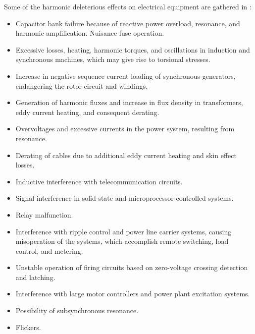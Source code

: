 \documentclass[12pt]{report} %
\begin{document}
Some of the harmonic deleterious effects on electrical equipment are gathered in \cite{harmonicseffects}:
\begin{itemize}
	\item Capacitor bank failure because of reactive power overload, resonance, and harmonic amplification. Nuisance fuse operation.
	\item Excessive losses, heating, harmonic torques, and oscillations in induction and synchronous machines, which may give rise to torsional stresses.
	\item Increase in negative sequence current loading of synchronous generators, endangering the rotor circuit and windings.
	\item Generation of harmonic fluxes and increase in flux density in transformers, eddy current heating, and consequent derating.
	\item Overvoltages and excessive currents in the power system, resulting from resonance.
	\item Derating of cables due to additional eddy current heating and skin effect losses.
	\item Inductive interference with telecommunication circuits.
	\item Signal interference in solid-state and microprocessor-controlled systems.
	\item Relay malfunction.
	\item Interference with ripple control and power line carrier systems, causing misoperation of the systems, which accomplish remote switching, load control, and metering.
	\item Unstable operation of firing circuits based on zero-voltage crossing detection and latching.
	\item Interference with large motor controllers and power plant excitation systems.
	\item Possibility of subsynchronous resonance.
	\item Flickers.
\end{itemize}
\end{document}
